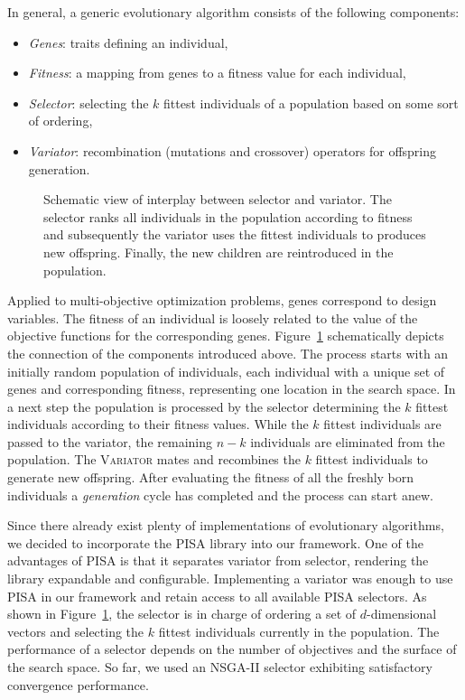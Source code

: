 \documentclass[%
reprint,
amsmath,amssymb,
aps,
]{revtex4-1}
\begin{document}
In general, a generic evolutionary algorithm consists of the following
  components:
%
\begin{itemize}
  \item \textit{Genes}: traits defining an individual,
  \item \textit{Fitness}: a mapping from genes to a fitness value for each
    individual,
  \item \textit{Selector}: selecting the $k$ fittest individuals of a
    population based on some sort of ordering,
  \item \textit{Variator}: recombination (mutations and crossover) operators
    for offspring generation.
\end{itemize}

\begin{figure}
    \centering
    \scalebox{1}{
    \begin{tikzpicture}[scale=0.8, transform shape, text=black]
    
    \end{tikzpicture}
	}
  \caption{Schematic view of interplay between selector and variator. The
  selector ranks all individuals in the population according to fitness and
  subsequently the variator uses the fittest individuals to produces new
  offspring. Finally, the new children are reintroduced in the population.}
  \label{fig:varsel}
\end{figure}

Applied to multi-objective optimization problems, genes correspond to
  design variables.
The fitness of an individual is loosely related to the value of the objective
  functions for the corresponding genes.
Figure~\ref{fig:varsel} schematically depicts the connection of the
  components introduced above.
The process starts with an initially random population of individuals, each
  individual with a unique set of genes and corresponding fitness,
  representing one location in the search space.
In a next step the population is processed by the selector
  determining the $k$ fittest individuals according to their fitness values.
While the $k$ fittest individuals are passed to the variator, the
  remaining $n-k$ individuals are eliminated from the population.
The \textsc{Variator} mates and recombines the $k$ fittest individuals to
  generate new offspring.
After evaluating the fitness of all the freshly born individuals a
  \textit{generation} cycle has completed and the process can start anew.

Since there already exist plenty of implementations of evolutionary algorithms,
  we decided to incorporate the PISA library \cite{pisa} into our
  framework.
One of the advantages of PISA is that it separates variator from selector,
  rendering the library expandable and configurable.
Implementing a variator was enough to use PISA in our framework and
  retain access to all available PISA selectors.
As shown in Figure~\ref{fig:varsel}, the selector is in charge of ordering a
  set of $d$-dimensional vectors and selecting the $k$ fittest individuals
  currently in the population.
The performance of a selector depends on the number of objectives and the
  surface of the search space.
So far, we used an NSGA-II selector \cite{dpam:02} exhibiting satisfactory
  convergence performance.
\end{document}
